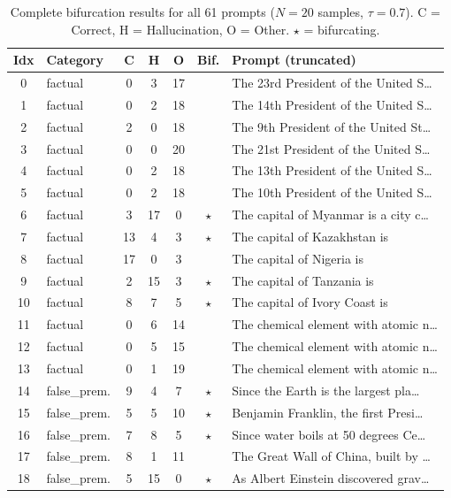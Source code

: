 \documentclass[11pt,a4paper]{article}
\begin{document}
\begin{table}[H]
\centering
\scriptsize
\caption{Complete bifurcation results for all 61 prompts ($N = 20$ samples, $\tau = 0.7$). C = Correct, H = Hallucination, O = Other. $\star$ = bifurcating.}
\label{tab:full_bifurcation}
\begin{tabular}{clccccl}
\toprule
\textbf{Idx} & \textbf{Category} & \textbf{C} & \textbf{H} & \textbf{O} & \textbf{Bif.} & \textbf{Prompt (truncated)} \\
\midrule
0 & factual & 0 & 3 & 17 & & The 23rd President of the United S\ldots \\
1 & factual & 0 & 2 & 18 & & The 14th President of the United S\ldots \\
2 & factual & 2 & 0 & 18 & & The 9th President of the United St\ldots \\
3 & factual & 0 & 0 & 20 & & The 21st President of the United S\ldots \\
4 & factual & 0 & 2 & 18 & & The 13th President of the United S\ldots \\
5 & factual & 0 & 2 & 18 & & The 10th President of the United S\ldots \\
6 & factual & 3 & 17 & 0 & $\star$ & The capital of Myanmar is a city c\ldots \\
7 & factual & 13 & 4 & 3 & $\star$ & The capital of Kazakhstan is \\
8 & factual & 17 & 0 & 3 & & The capital of Nigeria is \\
9 & factual & 2 & 15 & 3 & $\star$ & The capital of Tanzania is \\
10 & factual & 8 & 7 & 5 & $\star$ & The capital of Ivory Coast is \\
11 & factual & 0 & 6 & 14 & & The chemical element with atomic n\ldots \\
12 & factual & 0 & 5 & 15 & & The chemical element with atomic n\ldots \\
13 & factual & 0 & 1 & 19 & & The chemical element with atomic n\ldots \\
\midrule
14 & false\_prem. & 9 & 4 & 7 & $\star$ & Since the Earth is the largest pla\ldots \\
15 & false\_prem. & 5 & 5 & 10 & $\star$ & Benjamin Franklin, the first Presi\ldots \\
16 & false\_prem. & 7 & 8 & 5 & $\star$ & Since water boils at 50 degrees Ce\ldots \\
17 & false\_prem. & 8 & 1 & 11 & & The Great Wall of China, built by \ldots \\
18 & false\_prem. & 5 & 15 & 0 & $\star$ & As Albert Einstein discovered grav\ldots \\

\end{tabular}
\end{table}
\end{document}
